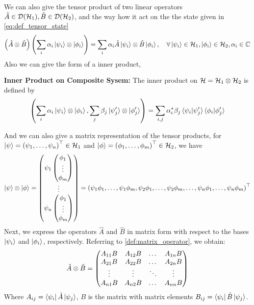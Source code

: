 We can also give the tensor product of two linear operators $\hat{A} \in \mathcal{D}(\mathcal{H}_1),\hat{B} \in \mathcal{D}(\mathcal{H}_2)$, and the way how it act on the the state given in \cref{eq:def_tensor_state}
\begin{eqnarray}
    \left(\hat{A} \otimes \hat{B}\right) \left(\sum_i \alpha_i \ket{\psi_i} \otimes \ket{\phi_i}\right) = \sum_i \alpha_i \hat{A} \ket{\psi_i} \otimes \hat{B} \ket{\phi_i}, \quad \forall \ket{\psi_i} \in \mathcal{H}_1, \ket{\phi_i} \in \mathcal{H}_2,  \alpha_i \in \mathbb{C}
\end{eqnarray}
Also we can give the form of a inner product,
\begin{definition}{\textbf{Inner Product on Composite Sysem:}}
    The inner product on $\mathcal{H}=\mathcal{H}_1 \otimes \mathcal{H}_2$ is defined by 
    \begin{align}
        \left(\sum_i \alpha_i \ket{\psi_i} \otimes \ket{\phi_i}, \sum_j \beta_j \ket{\psi'_j} \otimes \ket{\phi'_j}\right) = \sum_{i,j} \alpha^*_i  \beta_j \braket{\psi_i|\psi'_j} \braket{\phi_i|\phi'_j}
    \end{align}
\end{definition}
And we can also give a matrix representation of the tensor products, for $\ket{\psi} = \left(\psi_1,\dots,\psi_n\right)^{\top } \in \mathcal{H}_1$ and $\ket{\phi} = \left(\phi_1,\dots,\phi_m\right)^ \top \in \mathcal{H}_2$, we have
\begin{eqnarray}
    \ket{\psi} \otimes \ket{\phi} = \begin{pmatrix}
        \psi_1 \begin{pmatrix}
            \phi_1 \\
            \vdots\\
            \phi_m
        \end{pmatrix} \\
        \vdots \\
        \psi_n \begin{pmatrix}
            \phi_1\\
            \vdots \\
            \phi_m
        \end{pmatrix}
    \end{pmatrix} = \left( \psi_1 \phi_1,\dots,\psi_1 \phi_m, \psi_2 \phi_1, \dots , \psi_2 \phi_m, \dots, \psi_n \phi_1, \dots, \psi_n \phi_m \right)^ \top
\end{eqnarray}
Next, we express the operators $\hat{A}$ and $\hat{B}$ in matrix form with respect to the bases $\ket{\psi_i}$ and $\ket{\phi_i}$, respectively. Referring to \cref{def:matrix_operator}, we obtain:
\begin{eqnarray}
    \hat{A} \otimes \hat{B} = \begin{pmatrix}
        A_{11}B & A_{12}B & \dots & A_{1n}B \\
        A_{21}B & A_{22}B & \dots & A_{2n}B \\
        \vdots & \vdots & \ddots & \vdots \\
        A_{n1}B & A_{n2}B & \dots & A_{nn}B  
    \end{pmatrix}
\end{eqnarray}
Where $A_{ij} = \bra{\psi_i} \hat{A} \ket{\psi_j}$, $B$ is the matrix with matrix elements $B_{ij} = \bra{\psi_i} \hat{B} \ket{\psi_j} $. 

